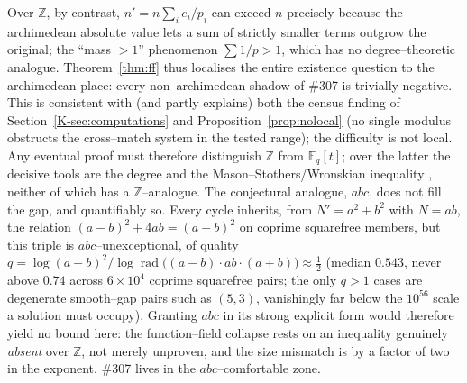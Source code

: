 \documentclass[11pt]{article}
\theoremstyle{definition}
\begin{document}
Over $\mathbb{Z}$, by contrast, $n'=n\sum_i e_i/p_i$ can exceed $n$ precisely because the archimedean
absolute value lets a sum of strictly smaller terms outgrow the original; the ``mass $>1$''
phenomenon $\sum 1/p>1$, which has no degree--theoretic analogue. Theorem~\ref{thm:ff} thus localises
the entire existence question to the archimedean place: every non--archimedean shadow of \#307 is
trivially negative. This is consistent with (and partly explains) both the census finding of
Section~\ref{K-sec:computations} and Proposition~\ref{prop:nolocal} (no single modulus obstructs the
cross--match system in the tested range); the difficulty is not local. Any eventual proof must therefore distinguish $\mathbb{Z}$ from $\mathbb{F}_q[t]$; over the
latter the decisive tools are the degree and the Mason--Stothers/Wronskian inequality
\cite{Stothers}, neither of which has a $\mathbb{Z}$--analogue. The conjectural analogue, $abc$,
does not fill the gap, and quantifiably so. Every cycle inherits, from $N'=a^2+b^2$ with $N=ab$, the
relation $(a-b)^2+4ab=(a+b)^2$ on coprime squarefree members, but this triple is $abc$--unexceptional,
of quality $q=\log(a+b)^2/\log\operatorname{rad}\!\bigl((a-b)\cdot ab\cdot(a+b)\bigr)\approx\tfrac12$
(median $0.543$, never above $0.74$ across $6\times10^4$ coprime squarefree pairs; the only $q>1$ cases
are degenerate smooth--gap pairs such as $(5,3)$, vanishingly far below the $10^{56}$ scale a solution
must occupy). Granting $abc$ in its strong explicit form would therefore yield no bound here: the
function--field collapse rests on an inequality genuinely \emph{absent} over $\mathbb{Z}$, not merely
unproven, and the size mismatch is by a factor of two in the exponent. \#307 lives in the
$abc$--comfortable zone.
\end{document}
